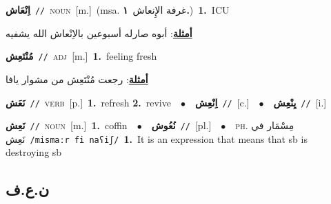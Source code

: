 \documentclass[10pt,a4paper,twoside]{article} %
\begin{document}
\begin{multicols}{2}
{\setlength\topsep{0pt}\textbf{\foreignlanguage{arabic}{اِنْعَاش}}\ {\color{gray}\texttt{//}\color{black}}\ \textsc{noun}\ [m.]\ \color{gray}(msa. \foreignlanguage{arabic}{غرفة الإِنعاش}~\foreignlanguage{arabic}{\textbf{١.}})\color{black}\ \textbf{1.}~ICU\  \begin{flushright}\color{gray}\foreignlanguage{arabic}{\textbf{\underline{\foreignlanguage{arabic}{أمثلة}}}: أبوه  صارله أسبوعين بالاِنْعاش الله يشفيه}\end{flushright}\color{black}} \vspace{2mm}

{\setlength\topsep{0pt}\textbf{\foreignlanguage{arabic}{مُنْتَعِش}}\ {\color{gray}\texttt{//}\color{black}}\ \textsc{adj}\ [m.]\ \textbf{1.}~feeling fresh\  \begin{flushright}\color{gray}\foreignlanguage{arabic}{\textbf{\underline{\foreignlanguage{arabic}{أمثلة}}}: رجعت مُنْتَعِش من مشوار يافا}\end{flushright}\color{black}} \vspace{2mm}

{\setlength\topsep{0pt}\textbf{\foreignlanguage{arabic}{نَعَش}}\ {\color{gray}\texttt{//}\color{black}}\ \textsc{verb}\ [p.]\ \textbf{1.}~refresh  \textbf{2.}~revive\ \ $\bullet$\ \ \setlength\topsep{0pt}\textbf{\foreignlanguage{arabic}{اِنْعِش}}\ {\color{gray}\texttt{//}\color{black}}\ [c.]\ \ $\bullet$\ \ \setlength\topsep{0pt}\textbf{\foreignlanguage{arabic}{يِنْعِش}}\ {\color{gray}\texttt{//}\color{black}}\ [i.]\ } \vspace{2mm}

{\setlength\topsep{0pt}\textbf{\foreignlanguage{arabic}{نَعِش}}\ {\color{gray}\texttt{//}\color{black}}\ \textsc{noun}\ [m.]\ \textbf{1.}~coffin\ \ $\bullet$\ \ \setlength\topsep{0pt}\textbf{\foreignlanguage{arabic}{نُعُوش}}\ {\color{gray}\texttt{//}\color{black}}\ [pl.]\ \ $\bullet$\ \ \textsc{ph.} \color{gray} \foreignlanguage{arabic}{مِسْمَار في نَعِش}\color{black}\ {\color{gray}\texttt{/{\sffamily mismaːr fi naʕiʃ}/}\color{black}}\ \textbf{1.}~It is an expression that means that sb is destroying sb\ } \vspace{2mm}

\vspace{-3mm}
\subsection*{\color{blue}\foreignlanguage{arabic}{ن.ع.ف}\color{blue}{}} 


\end{multicols}
\end{document}
